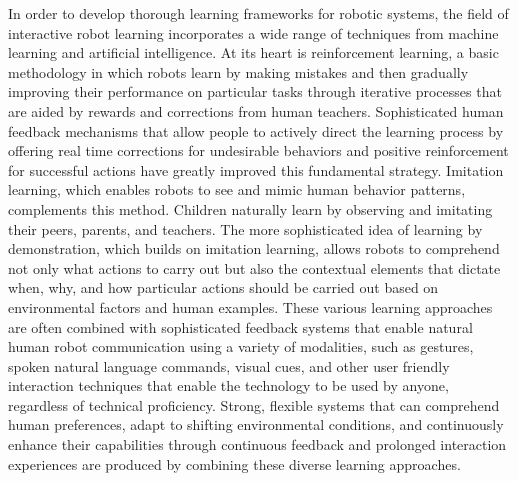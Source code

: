 \documentclass[report.tex]{subfiles}
\begin{document}
 In order to develop thorough learning frameworks for robotic systems, the field of interactive robot learning incorporates a wide range of techniques from machine learning and artificial intelligence.  At its heart is reinforcement learning, a basic methodology in which robots learn by making mistakes and then gradually improving their performance on particular tasks through iterative processes that are aided by rewards and corrections from human teachers.  Sophisticated human feedback mechanisms that allow people to actively direct the learning process by offering real time corrections for undesirable behaviors and positive reinforcement for successful actions have greatly improved this fundamental strategy.  Imitation learning, which enables robots to see and mimic human behavior patterns, complements this method. Children naturally learn by observing and imitating their peers, parents, and teachers.  The more sophisticated idea of learning by demonstration, which builds on imitation learning, allows robots to comprehend not only what actions to carry out but also the contextual elements that dictate when, why, and how particular actions should be carried out based on environmental factors and human examples.  These various learning approaches are often combined with sophisticated feedback systems that enable natural human robot communication using a variety of modalities, such as gestures, spoken natural language commands, visual cues, and other user friendly interaction techniques that enable the technology to be used by anyone, regardless of technical proficiency.  Strong, flexible systems that can comprehend human preferences, adapt to shifting environmental conditions, and continuously enhance their capabilities through continuous feedback and prolonged interaction experiences are produced by combining these diverse learning approaches.\\\\
\end{document}

